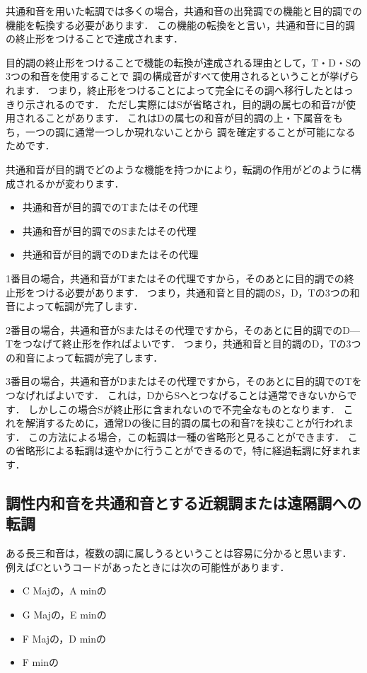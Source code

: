 \documentclass[dvipdfmx,uplatex,b5paper,openany,jbase=12Q,nomag*,textwidth-limit=44%
               ]{gachimuchi}
\begin{document}
共通和音を用いた転調では多くの場合，共通和音の出発調での機能と目的調での機能を転換する必要があります．
この機能の転換をと言い，共通和音に目的調の終止形をつけることで達成されます．
\begin{Yodan}%
目的調の終止形をつけることで機能の転換が達成される理由として，T・D・Sの3つの和音を使用することで%
調の構成音がすべて使用されるということが挙げられます．
つまり，終止形をつけることによって完全にその調へ移行したとはっきり示されるのです．
ただし実際にはSが省略され，目的調の属七の和音\Gnv\subsc7が使用されることがあります．
これはDの属七の和音が目的調の上・下属音をもち，一つの調に通常一つしか現れないことから
調を確定することが可能になるためです．
\end{Yodan}
共通和音が目的調でどのような機能を持つかにより，転調の作用がどのように構成されるかが変わります．
\begin{itemize}
  \item 共通和音が目的調でのTまたはその代理
  \item 共通和音が目的調でのSまたはその代理
  \item 共通和音が目的調でのDまたはその代理
\end{itemize}

1番目の場合，共通和音がTまたはその代理ですから，そのあとに目的調での終止形をつける必要があります．
つまり，共通和音と目的調のS，D，Tの3つの和音によって転調が完了します．

2番目の場合，共通和音がSまたはその代理ですから，そのあとに目的調でのD---Tをつなげて終止形を作ればよいです．
つまり，共通和音と目的調のD，Tの3つの和音によって転調が完了します．

3番目の場合，共通和音がDまたはその代理ですから，そのあとに目的調でのTをつなげればよいです．
これは，DからSへとつなげることは通常できないからです．
しかしこの場合Sが終止形に含まれないので不完全なものとなります．
これを解消するために，通常Dの後に目的調の属七の和音\Gnv\subsc7を挟むことが行われます．
この方法による場合，この転調は一種の省略形と見ることができます．
この省略形による転調は速やかに行うことができるので，特に経過転調に好まれます．

\subsection{調性内和音を共通和音とする近親調または遠隔調への転調}
ある長三和音は，複数の調に属しうるということは容易に分かると思います．
例えばCというコードがあったときには次の可能性があります．
\begin{itemize}
  \item C Majの\Gni ，A minの\bFlat\Gniii
  \item G Majの\Gniv ，E minの\bFlat\Gnvi
  \item F Majの\Gnv ，D minの\bFlat\Gnvii
  \item F minの\Gnv
\end{itemize}
\end{document}
